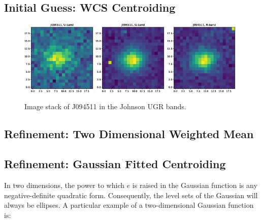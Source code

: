 \documentclass[a4paper,11pt]{article}
\begin{document}
\subsection{Initial Guess: WCS Centroiding}

\begin{figure}[H]
    \includegraphics[width=0.32\textwidth]{wcs_centroid_U_stack.eps}
    \includegraphics[width=0.32\textwidth]{wcs_centroid_G_stack.eps}
    \includegraphics[width=0.32\textwidth]{wcs_centroid_R_stack.eps}
    \caption{Image stack of J094511 in the Johnson UGR bands.}
    \label{fig:wcs_centroids}
\end{figure}

\subsection{Refinement: Two Dimensional Weighted Mean}
\subsection{Refinement: Gaussian Fitted Centroiding}

In two dimensions, the power to which $e$ is raised in the Gaussian function is
any negative-definite quadratic form.  Consequently, the level sets of the
Gaussian will always be ellipses. A particular example of a two-dimensional
Gaussian function is:
\end{document}
